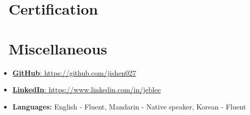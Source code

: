 \documentclass{resume}
\begin{document}
\section{\faCertificate\ Certification}

\section{\faInfo\ Miscellaneous}
\begin{itemize}[parsep=0.5ex]
  \item \href{https://github.com/jishen027}{\textbf{GitHub}: https://github.com/jishen027}
  \item \href{https://www.linkedin.com/in/jeblee}{\textbf{LinkedIn}: https://www.linkedin.com/in/jeblee} 
  \item \textbf{Languages:} English - Fluent, Mandarin - Native speaker, Korean - Fluent
\end{itemize}




%
%
\end{document}
